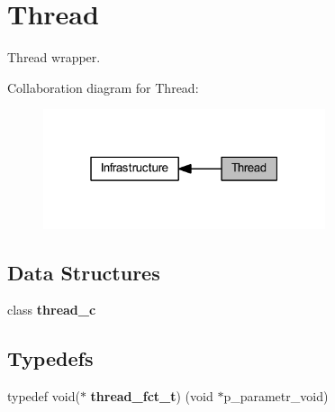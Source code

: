 \section{Thread}
\label{group___thread}


Thread wrapper.  


Collaboration diagram for Thread\+:
\nopagebreak
\begin{figure}[H]
\begin{center}
\leavevmode
\includegraphics[width=235pt]{group___thread}
\end{center}
\end{figure}
\subsection*{Data Structures}
\begin{DoxyCompactItemize}
\item 
class \textbf{ thread\+\_\+c}
\end{DoxyCompactItemize}
\subsection*{Typedefs}
\begin{DoxyCompactItemize}
\item 
typedef void($\ast$ \textbf{ thread\+\_\+fct\+\_\+t}) (void $\ast$p\+\_\+parametr\+\_\+void)
\end{DoxyCompactItemize}
